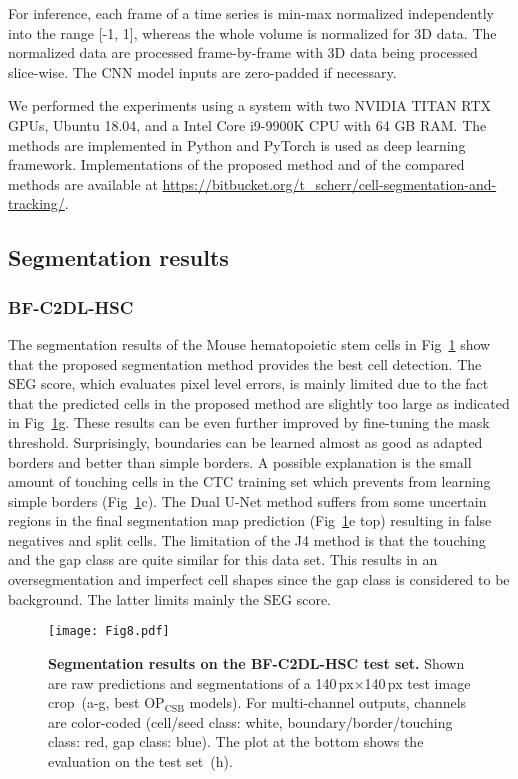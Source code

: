\documentclass[10pt,letterpaper]{article}
\begin{document}
For inference, each frame of a time series is min-max normalized independently into the range [-1, 1], whereas the whole volume is normalized for 3D data. The normalized data are processed frame-by-frame with 3D data being processed slice-wise. The CNN model inputs are zero-padded if necessary.

We performed the experiments using a system with two NVIDIA TITAN RTX GPUs, Ubuntu 18.04, and a Intel Core i9-9900K CPU with 64 GB RAM. The methods are implemented in Python and PyTorch is used as deep learning framework. Implementations of the proposed method and of the compared methods are available at \href{https://bitbucket.org/t\_scherr/cell-segmentation-and-tracking/}{https://bitbucket.org/t\_scherr/cell-segmentation-and-tracking/}.

\subsection*{Segmentation results}
\subsubsection*{BF-C2DL-HSC}
The segmentation results of the Mouse hematopoietic stem cells in Fig~\ref{fig:bf-c2dl-hsc-results} show that the proposed segmentation method provides the best cell detection. The $\mathrm{SEG}$ score, which evaluates pixel level errors, is mainly limited due to the fact that the predicted cells in the proposed method are slightly too large as indicated in Fig~\ref{fig:bf-c2dl-hsc-results}g. These results can be even further improved by fine-tuning the mask threshold. Surprisingly, boundaries can be learned almost as good as adapted borders and better than simple borders. A possible explanation is the small amount of touching cells in the CTC training set which prevents from learning simple borders (Fig~\ref{fig:bf-c2dl-hsc-results}c). The Dual U-Net method suffers from some uncertain regions in the final segmentation map prediction (Fig~\ref{fig:bf-c2dl-hsc-results}e top) resulting in false negatives and split cells. The limitation of the J4 method is that the touching and the gap class are quite similar for this data set. This results in an oversegmentation and imperfect cell shapes since the gap class is considered to be background. The latter limits mainly the $\mathrm{SEG}$ score.
\begin{figure}
\begin{adjustwidth}{-2.25in}{0in}
\centering
\texttt{[image: Fig8.pdf]}
\caption{\textbf{Segmentation results on the BF-C2DL-HSC test set.} Shown are raw predictions and segmentations of a 140\,px$\times$140\,px test image crop~(a-g, best $\mathrm{OP}_{\text{CSB}}$ models). For multi-channel outputs, channels are color-coded (cell/seed class: white, boundary/border/touching class: red, gap class: blue). The plot at the bottom shows the evaluation on the test set~(h).}
\label{fig:bf-c2dl-hsc-results}
\end{adjustwidth}
\end{figure}
\end{document}

